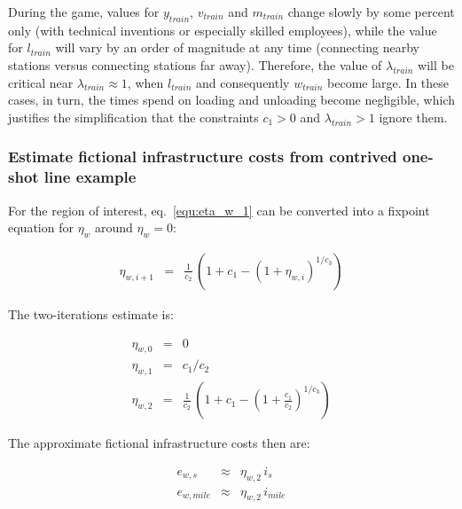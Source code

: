 \documentclass[12pt]{article}
\begin{document}
During the game, values for $y_\mathit{train}$, $v_\mathit{train}$ and $m_\mathit{train}$ change slowly by some percent only (with technical inventions or especially skilled employees), while the value for $l_\mathit{train}$ will vary by an order of magnitude at any time (connecting nearby stations versus connecting stations far away). Therefore, the value of $\lambda_\mathit{train}$ will be critical near $\lambda_\mathit{train} \approx 1$, when $l_\mathit{train}$ and consequently $w_\mathit{train}$ become large. In these cases, in turn, the times spend on loading and unloading become negligible, which justifies the simplification that the constraints $c_1 > 0$ and $\lambda_\mathit{train} > 1$ ignore them.

\subsubsection{Estimate fictional infrastructure costs from contrived one-shot line example}
\label{sec:solve_eta_w_1}

For the region of interest, eq.~\ref{equ:eta_w_1} can be converted into a fixpoint equation for $\eta_w$ around $\eta_w=0$:

\begin{eqnarray}
\eta_{w,i+1} &=& \frac{1}{c_2}\,\left( 1 + c_1 - \left(1 + \eta_{w,i}\right)^{1/c_3}\right)
\end{eqnarray}

The two-iterations estimate is:

\begin{eqnarray}
\eta_{w,0} &=& 0 \\
\eta_{w,1} &=& c_1 / c_2 \\
\eta_{w,2} &=& \frac{1}{c_2}\,\left( 1 + c_1 - \left(1 + \frac{c_1}{c_2}\right)^{1/c_3}\right)
\end{eqnarray}

The approximate fictional infrastructure costs then are:

\begin{eqnarray}
e_{w,s} &\approx & \eta_{w,2} \, i_s \\
e_{w,\mathit{mile}} &\approx & \eta_{w,2} \, i_\mathit{mile}
\end{eqnarray}
\end{document}
